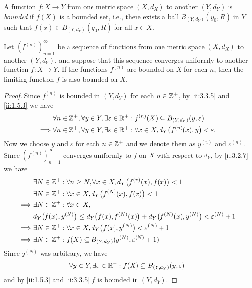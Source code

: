 \begin{defn}\label{ii:3.3.5}
  A function \(f : X \to Y\) from one metric space \((X, d_X)\) to another \((Y, d_Y)\) is \emph{bounded} if \(f(X)\) is a bounded set, i.e., there exists a ball \(B_{(Y, d_Y)}(y_0, R)\) in \(Y\) such that \(f(x) \in B_{(Y, d_Y)}(y_0, R)\) for all \(x \in X\).
\end{defn}

\begin{prop}\label{ii:3.3.6}
  Let \((f^{(n)})_{n = 1}^\infty\) be a sequence of functions from one metric space \((X, d_X)\) to another \((Y, d_Y)\), and suppose that this sequence converges uniformly to another function \(f : X \to Y\).
  If the functions \(f^{(n)}\) are bounded on \(X\) for each \(n\), then the limiting function \(f\) is also bounded on \(X\).
\end{prop}

\begin{proof}
  Since \(f^{(n)}\) is bounded in \((Y, d_Y)\) for each \(n \in \mathbb{Z}^+\), by \cref{ii:3.3.5} and \cref{ii:1.5.3} we have
  \begin{align*}
             & \forall n \in \mathbb{Z}^+, \forall y \in Y, \exists \varepsilon \in \mathbb{R}^+ : f^{(n)}(X) \subseteq B_{(Y, d_Y)}(y, \varepsilon)          \\
    \implies & \forall n \in \mathbb{Z}^+, \forall y \in Y, \exists \varepsilon \in \mathbb{R}^+ : \forall x \in X, d_Y\big(f^{(n)}(x), y\big) < \varepsilon.
  \end{align*}
  Now we choose \(y\) and \(\varepsilon\) for each \(n \in \mathbb{Z}^+\) and we denote them as \(y^{(n)}\) and \(\varepsilon^{(n)}\).
  Since \((f^{(n)})_{n = 1}^\infty\) converges uniformly to \(f\) on \(X\) with respect to \(d_Y\), by \cref{ii:3.2.7} we have
  \begin{align*}
             & \exists N \in \mathbb{Z}^+ : \forall n \geq N, \forall x \in X, d_Y\big(f^{(n)}(x), f(x)\big) < 1                                \\
             & \exists N \in \mathbb{Z}^+ : \forall x \in X, d_Y\big(f^{(N)}(x), f(x)\big) < 1                                                  \\
    \implies & \exists N \in \mathbb{Z}^+ : \forall x \in X,                                                                                    \\
             & d_Y\big(f(x), y^{(N)}\big) \leq d_Y\big(f(x), f^{(N)}(x)\big) + d_Y\big(f^{(N)}(x), y^{(N)}\big) < \varepsilon^{(N)} + 1 \\
    \implies & \exists N \in \mathbb{Z}^+ : \forall x \in X, d_Y\big(f(x), y^{(N)}\big) < \varepsilon^{(N)} + 1                                 \\
    \implies & \exists N \in \mathbb{Z}^+ : f(X) \subseteq B_{(Y, d_Y)}(y^{(N)}, \varepsilon^{(N)} + 1).
  \end{align*}
  Since \(y^{(N)}\) was arbitrary, we have
  \[
    \forall y \in Y, \exists \varepsilon \in \mathbb{R}^+ : f(X) \subseteq B_{(Y, d_Y)}(y, \varepsilon)
  \]
  and by \cref{ii:1.5.3} and \cref{ii:3.3.5} \(f\) is bounded in \((Y, d_Y)\).
\end{proof}

